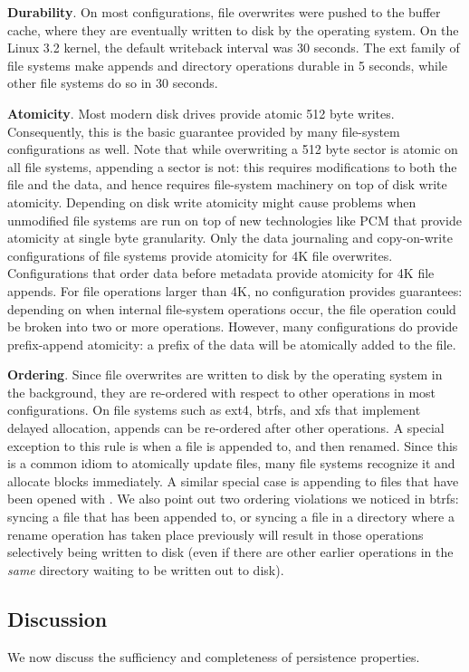 \textbf{Durability}. On most configurations, file overwrites were pushed to the
buffer cache, where they are eventually written to disk by the operating
system. On the Linux 3.2 kernel, the default writeback interval was 30 seconds.
The ext family of file systems make appends and directory operations durable in
5 seconds, while other file systems do so in 30 seconds.

\textbf{Atomicity}. Most modern disk drives provide atomic 512 byte writes.
Consequently, this is the basic guarantee provided by many file-system
configurations as well. Note that while overwriting a 512 byte sector is atomic
on all file systems, appending a sector is not: this requires modifications to
both the file and the data, and hence requires file-system machinery on top of
disk write atomicity. Depending on disk write atomicity might cause problems
when unmodified file systems are run on top of new technologies like PCM that
provide atomicity at single byte granularity. Only the data journaling and
copy-on-write configurations of file systems provide atomicity for 4K file
overwrites. Configurations that order data before metadata provide atomicity
for 4K file appends. For file operations larger than 4K, no configuration
provides guarantees: depending on when internal file-system operations
occur, the file operation could be broken into two or more operations.
However, many configurations do provide prefix-append atomicity: a prefix
of the data will be atomically added to the file.

\textbf{Ordering}. Since file overwrites are written to disk by the operating
system in the background, they are re-ordered with respect to other operations
in most configurations. On file systems such as ext4, btrfs, and xfs that
implement delayed allocation, appends can be re-ordered after other operations.
A special exception to this rule is when a file is appended to, and then
renamed. Since this is a common idiom to atomically update files, many file
systems recognize it and allocate blocks immediately. A similar special case is
appending to files that have been opened with . We also point
out two ordering violations we noticed in btrfs: syncing a file that has been
appended to, or syncing a file in a directory where a rename operation has
taken place previously will result in those operations selectively being
written to disk (even if there are other earlier operations in the
\textit{same} directory waiting to be written out to disk).

\subsection{Discussion}
We now discuss the sufficiency and completeness of persistence properties.

